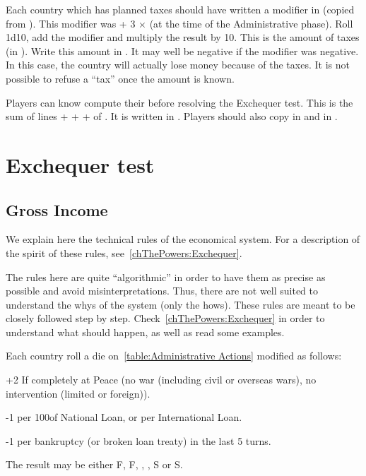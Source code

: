 \bparag Each country which has planned taxes should have written a modifier in
 (copied from
). This modifier was \ADM + 3
$\times$ \STAB (at the time of the Administrative phase).
\bparag Roll 1d10, add the modifier and multiply the result by 10. This is the
amount of taxes (in \ducats).
\bparag Write this amount in . It may well be
negative if the modifier was negative. In this case, the country will actually
lose money because of the taxes. It is not possible to refuse a ``tax'' once
the amount is known.

\bparag Players can know compute their \RT before resolving the Exchequer
test.
\bparag This is the sum of lines  +
 +  +
 of \EcoRS. It is written in .
\bparag Players should also copy  in
 and  in
.

\section{Exchequer test}\label{chPeace:Exchequer test}
\subsection{Gross Income}
\begin{designnote}
  We explain here the technical rules of the economical system. For a
  description of the spirit of these rules, see~\ref{chThePowers:Exchequer}.

  The rules here are quite ``algorithmic'' in order to have them as precise as
  possible and avoid misinterpretations. Thus, there are not well suited to
  understand the whys of the system (only the hows). These rules are meant to
  be closely followed step by step. Check~\ref{chThePowers:Exchequer} in order
  to understand what should happen, as well as read some examples.
\end{designnote}

 Each country roll a die on~\ref{table:Administrative
  Actions} modified as follows:
\begin{modlist}
\item[+2] If completely at Peace (no war (including civil or overseas wars),
  no intervention (limited or foreign)).
\item[-1 ] per 100\ducats of National Loan, or per International Loan.
\item[-1 ] per bankruptcy (or broken loan treaty) in the last 5 turns.
\end{modlist}
\bparag The result may be either F\textetoile, F, \undemi, \undemi\textetoile,
S or S\textetoile.

